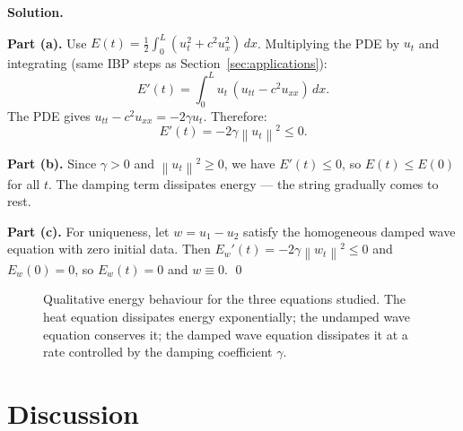 \documentclass[12pt,a4paper]{article}
\theoremstyle{plain}
\theoremstyle{definition}
\newcommand{\norm}[1]{\left\lVert #1 \right\rVert}
\begin{document}
\textbf{Solution.}

\textbf{Part (a).} Use $E(t)=\tfrac{1}{2}\int_0^L(u_t^2+c^2 u_x^2)\,dx$. Multiplying
the PDE by $u_t$ and integrating (same IBP steps as Section~\ref{sec:applications}):
\[
  E'(t) = \int_0^L u_t\,(u_{tt}-c^2 u_{xx})\,dx.
\]
The PDE gives $u_{tt}-c^2 u_{xx}=-2\gamma u_t$. Therefore:
\begin{equation}
  E'(t) = -2\gamma\norm{u_t}^2 \leq 0.
  \label{eq:damped-energy}
\end{equation}

\textbf{Part (b).} Since $\gamma>0$ and $\norm{u_t}^2\geq 0$, we have $E'(t)\leq 0$,
so $E(t)\leq E(0)$ for all $t$. The damping term dissipates energy — the string
gradually comes to rest.

\textbf{Part (c).} For uniqueness, let $w=u_1-u_2$ satisfy the homogeneous damped
wave equation with zero initial data. Then $E_w'(t)=-2\gamma\norm{w_t}^2\leq 0$ and
$E_w(0)=0$, so $E_w(t)=0$ and $w\equiv 0$. \qed

\begin{figure}[H]
\centering
{}
\caption{Qualitative energy behaviour for the three equations studied.
  The heat equation dissipates energy exponentially; the undamped wave equation
  conserves it; the damped wave equation dissipates it at a rate controlled by
  the damping coefficient $\gamma$.}
\label{fig:energy-comparison}
\end{figure}

\section{Discussion}
\label{sec:discussion}
\end{document}
